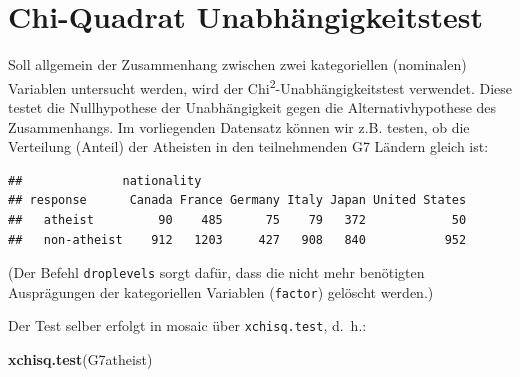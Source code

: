\documentclass[12pt,ngerman,paper=a4,pagesize,DIV=13]{scrreprt}
\newenvironment{Shaded}{\begin{snugshade}}{\end{snugshade}}
\newcommand{\DataTypeTok}[1]{\textcolor[rgb]{0.13,0.29,0.53}{#1}}
\newcommand{\DecValTok}[1]{\textcolor[rgb]{0.00,0.00,0.81}{#1}}
\newcommand{\FloatTok}[1]{\textcolor[rgb]{0.00,0.00,0.81}{#1}}
\newcommand{\KeywordTok}[1]{\textcolor[rgb]{0.13,0.29,0.53}{\textbf{#1}}}
\newcommand{\NormalTok}[1]{#1}
\newcommand{\OperatorTok}[1]{\textcolor[rgb]{0.81,0.36,0.00}{\textbf{#1}}}
\newcommand{\StringTok}[1]{\textcolor[rgb]{0.31,0.60,0.02}{#1}}
\begin{document}
\hypertarget{chi-quadrat-unabhangigkeitstest}{%
\section{Chi-Quadrat
Unabhängigkeitstest}\label{chi-quadrat-unabhangigkeitstest}}

Soll allgemein der Zusammenhang zwischen zwei kategoriellen (nominalen)
Variablen untersucht werden, wird der
Chi\textsuperscript{2}-Unabhängigkeitstest verwendet. Diese testet die
Nullhypothese der Unabhängigkeit gegen die Alternativhypothese des
Zusammenhangs. Im vorliegenden Datensatz können wir z.B. testen, ob die
Verteilung (Anteil) der Atheisten in den teilnehmenden G7 Ländern gleich
ist:

\begin{Shaded}
\end{Shaded}

\begin{verbatim}
##              nationality
## response      Canada France Germany Italy Japan United States
##   atheist         90    485      75    79   372            50
##   non-atheist    912   1203     427   908   840           952
\end{verbatim}

(Der Befehl \texttt{droplevels} sorgt dafür, dass die nicht mehr
benötigten Ausprägungen der kategoriellen Variablen (\texttt{factor})
gelöscht werden.)

Der Test selber erfolgt in mosaic über \texttt{xchisq.test}, d.~h.:

\begin{Shaded}
\begin{Highlighting}[]
\KeywordTok{xchisq.test}\NormalTok{(G7atheist)}
\end{Highlighting}
\end{Shaded}
\end{document}

